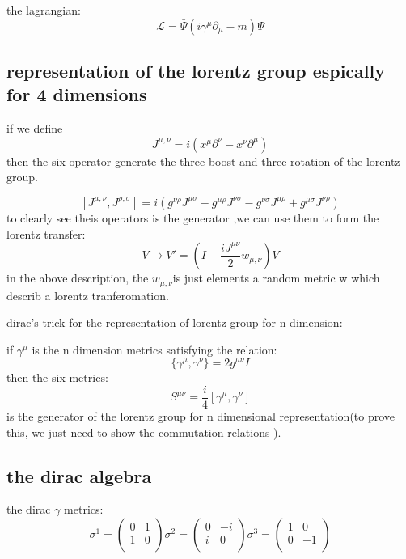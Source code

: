 the lagrangian:
\[\mathcal{L}=\bar{\Psi}(i\gamma^\mu\partial_\mu-m)\Psi\]
\subsection{representation of the lorentz group espically for 4 dimensions}
if we define 
\[J^{\mu,\nu}=i(x^{\mu}\partial^{\nu}-x^{\nu}\partial^{\mu})\]
then the six operator generate the three boost and three rotation of the lorentz group.\par
\[[J^{\mu,\nu},J^{\rho,\sigma}]=i(g^{\nu \rho}J^{\mu \sigma}-g^{\mu \rho}J^{\nu \sigma}-g^{\nu \sigma}J^{\mu \rho}+g^{\mu \sigma}J^{\nu \rho})\]
to clearly see theis operators is the generator ,we can use them to form the lorentz transfer:
\[V\rightarrow V'=(I-\frac{iJ^{\mu\nu}}{2}w_{\mu,\nu})V\]
in the above description, the $w_{\mu,\nu}$is just elements a random metric w which describ a lorentz tranferomation.\par
dirac's trick for the representation of lorentz group for n dimension:\par
if $\gamma^{\mu}$ is the n dimension metrics satisfying the relation:
\[\{\gamma^{\mu},\gamma^{\nu}\}=2g^{\mu\nu}I\]
then the six metrics:
\[S^{\mu\nu}=\frac{i}{4}[\gamma^{\mu},\gamma^{\nu}]\]
is the generator of the lorentz group for n dimensional representation(to prove  this, we just need to show the commutation relations ).\par

\subsection{the dirac algebra}

the dirac $\gamma$ metrics:
\begin{equation}
\sigma^1=\left(
\begin{array}{cc}
0&1\\
1&0\\
\end{array}
\right)
\sigma^2=\left(
\begin{array}{cc}
0&-i\\
i&0\\
\end{array}
\right)
\sigma^3=\left(
\begin{array}{cc}
1&0\\
0&-1\\
\end{array}
\right)
\end{equation}


